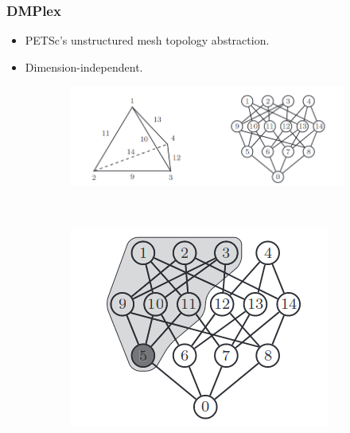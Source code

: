 \documentclass{beamer}
\begin{document}
\begin{frame}
  \frametitle{DMPlex}

  \begin{itemize}
    \item
      PETSc's unstructured mesh topology abstraction.
    \item
      Dimension-independent.
  \end{itemize}

  \begin{figure}
    \centering
    \begin{subfigure}[b]{0.6\textwidth}
      \centering
      \includegraphics[width=\textwidth]{hasse}
    \end{subfigure}
    \\
    \begin{subfigure}[b]{0.3\textwidth}
      \centering
      \includegraphics[width=\textwidth]{closure}
    \end{subfigure}
    \begin{subfigure}[b]{0.3\textwidth}
      \centering

\end{subfigure}
\end{figure}
\end{frame}
\end{document}

